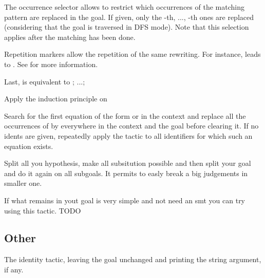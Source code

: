   \smallskip
  
  The occurrence selector  allows to restrict which occurrences
  of the matching pattern are replaced in the goal. If given, only the
  -th, ..., -th ones are replaced (considering that the goal is
  traversed in DFS mode). Note that this selection applies after the matching has
  been done.
  
  \medskip
  
  Repetition markers allow the repetition of the same rewriting. For instance,
  \tacname{}  leads to  \tacname{} . See  for
  more information.
  
  \medskip

  Last, \tacname{}  is equivalent to
  \tacname{} ; ...; \tacname{} 

Apply the induction principle  on 

Search for the first equation of the form  or  in the context
 and replace all the occurrences of  by  everywhere in the context and the
 goal before clearing it. If no idents are given, repeatedly apply the tactic to
 all identifiers for which such an equation exists.

Split all you hypothesis, make all subsitution possible and then split your goal and do it again on all subgoals. It
permits to easly break a big judgements in smaller one.

If what remains in yout goal is very simple and not need an smt you can try using this tactic. TODO




\subsection{Other}

The identity tactic, leaving the goal unchanged and printing the string argument, if any.

